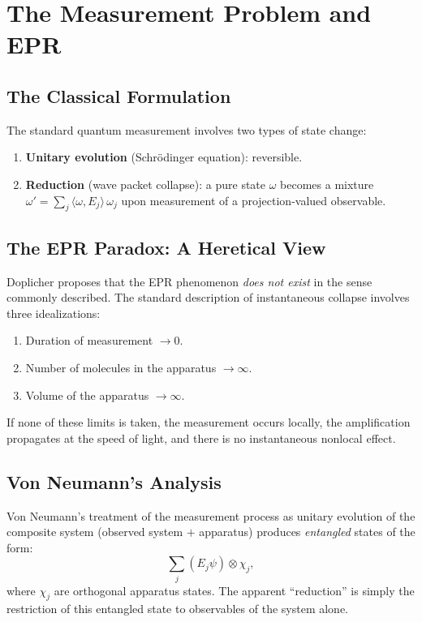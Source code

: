 \documentclass[11pt,a4paper]{article}
\begin{document}
\section{The Measurement Problem and EPR}

\subsection{The Classical Formulation}

The standard quantum measurement involves two types of state change:
\begin{enumerate}[nosep]
  \item \textbf{Unitary evolution} (Schr\"odinger equation): reversible.
  \item \textbf{Reduction} (wave packet collapse): a pure state $\omega$
        becomes a mixture $\omega' = \sum_j \langle \omega, E_j\rangle\, \omega_j$
        upon measurement of a projection-valued observable.
\end{enumerate}

\subsection{The EPR Paradox: A Heretical View}

Doplicher proposes that the EPR phenomenon \emph{does not exist} in the
sense commonly described. The standard description of instantaneous
collapse involves three idealizations:
\begin{enumerate}[nosep]
  \item Duration of measurement $\to 0$.
  \item Number of molecules in the apparatus $\to \infty$.
  \item Volume of the apparatus $\to \infty$.
\end{enumerate}
If none of these limits is taken, the measurement occurs locally, the
amplification propagates at the speed of light, and there is no
instantaneous nonlocal effect.

\subsection{Von Neumann's Analysis}

Von Neumann's treatment of the measurement process as unitary evolution
of the composite system (observed system $+$ apparatus) produces
\emph{entangled} states of the form:
\begin{equation}
  \sum_j (E_j \psi) \otimes \chi_j,
\end{equation}
where $\chi_j$ are orthogonal apparatus states. The apparent ``reduction''
is simply the restriction of this entangled state to observables of the
system alone.
\end{document}
